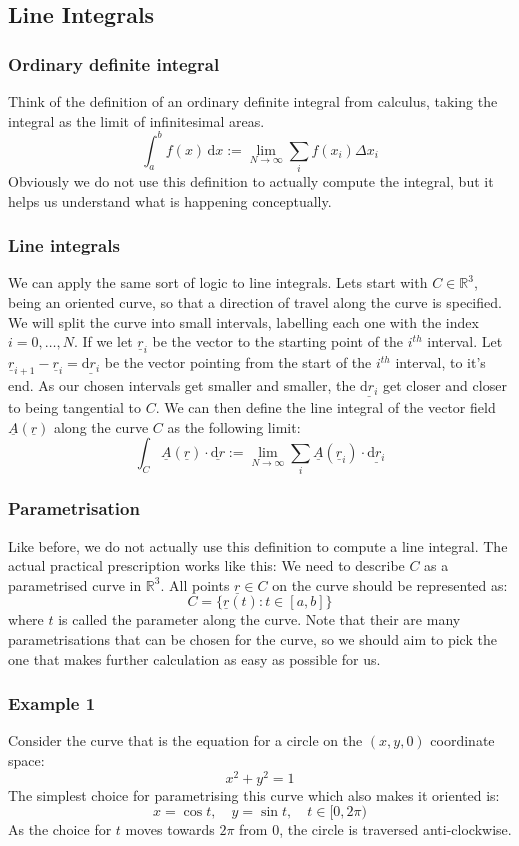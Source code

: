 \documentclass[12pt]{article}
\begin{document}
\subsection{Line Integrals}
\subsubsection{Ordinary definite integral}
Think of the definition of an ordinary definite integral from calculus, taking the integral as the limit of infinitesimal areas.
\[\int^b_af(x)\,\text{d}x:=\lim_{N\to \infty}\sum_if(x_i)\Delta x_i\]
Obviously we do not use this definition to actually compute the integral, but it helps us understand what is happening conceptually.
\subsubsection{Line integrals}
We can apply the same sort of logic to line integrals. Lets start with \(C\in\mathbb{R}^3\), being an oriented curve, so that a direction of travel along the curve is specified. We will split the curve into small intervals, labelling each one with the index \(i=0,\dots,N\). If we let \(\underline{r}_i\) be the vector to the starting point of the  \(i^{th}\) interval. Let \(\underline{r}_{i+1}-\underline{r}_i=\underline{\text{d}r_i}\) be the vector pointing from the start of the \(i^{th}\) interval, to it's end. As our chosen intervals get smaller and smaller, the \(\underline{\text{d}r_i}\) get closer and closer to being tangential to \(C\). We can then define the line integral of the vector field \(\underline{A}(\underline{r})\) along the curve \(C\) as the following limit:
\[\int_C\underline{A}(\underline{r})\cdot \underline{\text{d}r}:=\lim_{N\to\infty}\sum_i\underline{A}(\underline{r}_i)\cdot \underline{\text{d}r_i}\]
\subsubsection{Parametrisation}
Like before, we do not actually use this definition to compute a line integral. The actual practical prescription works like this: We need to describe \(C\) as a parametrised curve in \(\mathbb{R}^3\). All points \(\underline{r}\in C\) on the curve should be represented as:
\[C=\{\underline{r}(t):t\in[a,b]\}\]
where \(t\) is called the parameter along the curve. Note that their are many parametrisations that can be chosen for the curve, so we should aim to pick the one that makes further calculation as easy as possible for us.
\subsubsection*{Example 1}
Consider the curve that is the equation for a circle on the \((x,y,0)\) coordinate space:
\[x^2+y^2=1\]
The simplest choice for parametrising this curve which also makes it oriented is:
\[x=\cos{t},\quad y=\sin{t},\quad t\in[0,2\pi)\]
As the choice for \(t\) moves towards \(2\pi\) from \(0\), the circle is traversed anti-clockwise.
\end{document}
